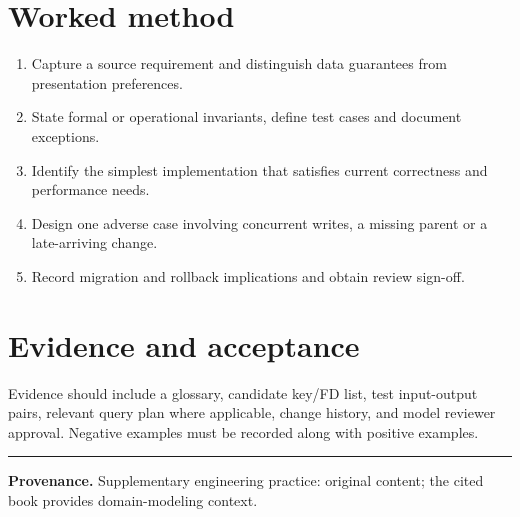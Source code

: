 \documentclass[11pt,letterpaper]{article}
\begin{document}
\section{Worked method}
\begin{enumerate}
\item Capture a source requirement and distinguish data guarantees from presentation preferences.
\item State formal or operational invariants, define test cases and document exceptions.
\item Identify the simplest implementation that satisfies current correctness and performance needs.
\item Design one adverse case involving concurrent writes, a missing parent or a late-arriving change.
\item Record migration and rollback implications and obtain review sign-off.
\end{enumerate}

\section{Evidence and acceptance}
Evidence should include a glossary, candidate key/FD list, test input-output pairs, relevant query plan where applicable, change history, and model reviewer approval. Negative examples must be recorded along with positive examples.


\vfill
\hrule
{\footnotesize\textbf{Provenance.} Supplementary engineering practice: original content; the cited book provides domain-modeling context.}
\end{document}
